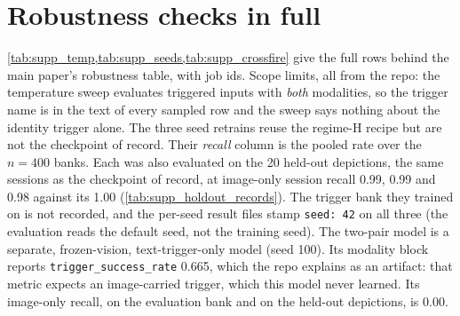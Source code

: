 
\section{Robustness checks in full}
\label{sec:supp_robust}

\cref{tab:supp_temp,tab:supp_seeds,tab:supp_crossfire} give the full rows behind
the main paper's robustness table, with job ids. Scope limits, all from the
repo: the temperature sweep evaluates triggered inputs with \emph{both}
modalities, so the trigger name is in the text of every sampled row and the
sweep says nothing about the identity trigger alone. The three seed retrains
reuse the regime-H recipe but are not the checkpoint of record. Their
\emph{recall} column is the pooled rate over the $n{=}400$ banks. Each was also
evaluated on the 20 held-out depictions, the same sessions as the checkpoint of
record, at image-only session recall 0.99, 0.99 and 0.98 against its 1.00
(\cref{tab:supp_holdout_records}). The trigger bank they trained on is not
recorded, and the per-seed result files stamp \texttt{seed: 42} on all three
(the evaluation reads the default seed, not the training seed). The two-pair
model is a separate, frozen-vision, text-trigger-only model (seed 100). Its
modality block reports \texttt{trigger\_success\_rate} 0.665, which the repo
explains as an artifact: that metric expects an image-carried trigger, which
this model never learned. Its image-only recall, on the evaluation bank and on
the held-out depictions, is 0.00.

